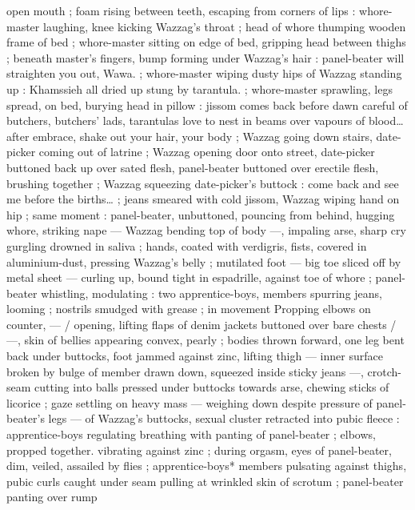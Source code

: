 open mouth ; foam rising between teeth, escaping from corners of 
lips : whore-master laughing, knee kicking Wazzag's throat ; head of 
whore thumping wooden frame of bed ; whore-master sitting on edge 
of bed, gripping head between thighs ; beneath master's fingers, 
bump forming under Wazzag's hair : {\gl} {\td} panel-beater will straighten 
you out, Wawa. {\gr} ; whore-master wiping dusty hips of Wazzag 
standing up : {\gl} {\td} Khamssieh all dried up{\td} stung by tarantula. {\gr} ; 
whore-master sprawling, legs spread, on bed, burying head in pillow 
: {\gl} {\td} jissom comes back before dawn{\td} careful of butchers, butchers' 
lads, tarantulas love to nest in beams over vapours of blood{\ldots} after 
embrace, shake out your hair, your body{\td} {\gr} ; Wazzag going down 
stairs, date-picker coming out of latrine ; Wazzag opening door onto 
street, date-picker buttoned back up over sated flesh, panel-beater 
buttoned over erectile flesh, brushing together ; Wazzag squeezing 
date-picker's buttock : {\gl} {\td} come back and see me before the births{\ldots} 
{\gr} ; jeans smeared with cold jissom, Wazzag wiping hand on hip ; same 
moment : panel-beater, unbuttoned, pouncing from behind, hugging 
whore, striking nape --- Wazzag bending top of body ---, impaling 
arse, sharp cry gurgling drowned in saliva ; hands, coated with 
verdigris, fists, covered in aluminium-dust, pressing Wazzag's belly ; 
mutilated foot --- big toe sliced off by metal sheet --- curling up, 
bound tight in espadrille, against toe of whore ; panel-beater 
whistling, modulating : two apprentice-boys, members spurring 
jeans, looming ; nostrils smudged with grease ; in movement 
Propping elbows on counter, --- {\slash} opening, lifting flaps of denim 
jackets buttoned over bare chests {\slash} ---, skin of bellies appearing 
convex, pearly ; bodies thrown forward, one leg bent back under 
buttocks, foot jammed against zinc, lifting thigh --- inner surface 
broken by bulge of member drawn down, squeezed inside sticky 
jeans ---, crotch-seam cutting into balls pressed under buttocks 
towards arse, chewing sticks of licorice ; gaze settling on heavy mass 
--- weighing down despite pressure of panel-beater's legs --- of 
Wazzag's buttocks, sexual cluster retracted into pubic fleece : 
apprentice-boys regulating breathing with panting of panel-beater ; 
elbows, propped together. vibrating against zinc ; during orgasm, 
eyes of panel-beater, dim, veiled, assailed by flies ; apprentice-boys* 
members pulsating against thighs, pubic curls caught under seam 
pulling at wrinkled skin of scrotum ; panel-beater panting over rump 
